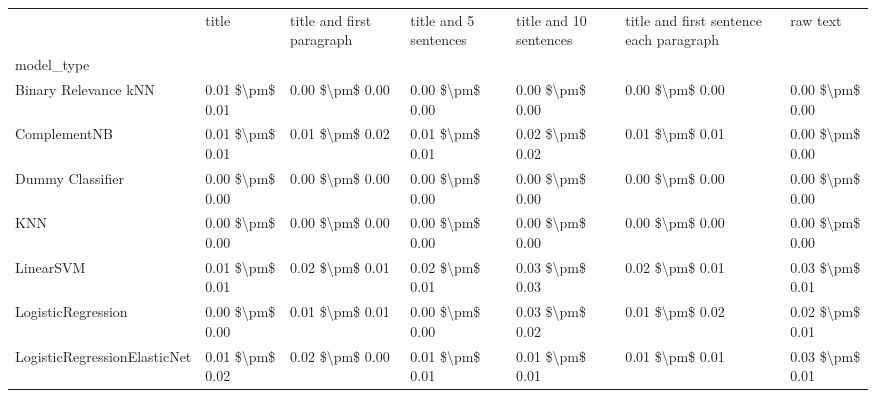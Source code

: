 \begin{tabular}{lllllll}
\toprule
{} &            title & title and first paragraph & title and 5 sentences & title and 10 sentences & title and first sentence each paragraph &         raw text \\
model\_type                      &                  &                           &                       &                        &                                         &                  \\
\midrule
Binary Relevance kNN            &  0.01 \$\textbackslash pm\$ 0.01 &           0.00 \$\textbackslash pm\$ 0.00 &       0.00 \$\textbackslash pm\$ 0.00 &        0.00 \$\textbackslash pm\$ 0.00 &                         0.00 \$\textbackslash pm\$ 0.00 &  0.00 \$\textbackslash pm\$ 0.00 \\
ComplementNB                    &  0.01 \$\textbackslash pm\$ 0.01 &           0.01 \$\textbackslash pm\$ 0.02 &       0.01 \$\textbackslash pm\$ 0.01 &        0.02 \$\textbackslash pm\$ 0.02 &                         0.01 \$\textbackslash pm\$ 0.01 &  0.00 \$\textbackslash pm\$ 0.00 \\
Dummy Classifier                &  0.00 \$\textbackslash pm\$ 0.00 &           0.00 \$\textbackslash pm\$ 0.00 &       0.00 \$\textbackslash pm\$ 0.00 &        0.00 \$\textbackslash pm\$ 0.00 &                         0.00 \$\textbackslash pm\$ 0.00 &  0.00 \$\textbackslash pm\$ 0.00 \\
KNN                             &  0.00 \$\textbackslash pm\$ 0.00 &           0.00 \$\textbackslash pm\$ 0.00 &       0.00 \$\textbackslash pm\$ 0.00 &        0.00 \$\textbackslash pm\$ 0.00 &                         0.00 \$\textbackslash pm\$ 0.00 &  0.00 \$\textbackslash pm\$ 0.00 \\
LinearSVM                       &  0.01 \$\textbackslash pm\$ 0.01 &           0.02 \$\textbackslash pm\$ 0.01 &       0.02 \$\textbackslash pm\$ 0.01 &        0.03 \$\textbackslash pm\$ 0.03 &                         0.02 \$\textbackslash pm\$ 0.01 &  0.03 \$\textbackslash pm\$ 0.01 \\
LogisticRegression              &  0.00 \$\textbackslash pm\$ 0.00 &           0.01 \$\textbackslash pm\$ 0.01 &       0.00 \$\textbackslash pm\$ 0.00 &        0.03 \$\textbackslash pm\$ 0.02 &                         0.01 \$\textbackslash pm\$ 0.02 &  0.02 \$\textbackslash pm\$ 0.01 \\
LogisticRegressionElasticNet    &  0.01 \$\textbackslash pm\$ 0.02 &           0.02 \$\textbackslash pm\$ 0.00 &       0.01 \$\textbackslash pm\$ 0.01 &        0.01 \$\textbackslash pm\$ 0.01 &                         0.01 \$\textbackslash pm\$ 0.01 &  0.03 \$\textbackslash pm\$ 0.01 \\

\end{tabular}
